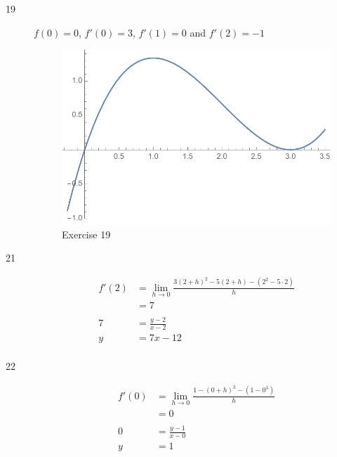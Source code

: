 \documentclass[letterpaper, landscape]{exam}
\begin{document}
\begin{description}
\begin{enumerate}[(a)]
        \end{enumerate}

      \item[19] $f(0) = 0$, $f'(0) = 3$, $f'(1) = 0$ and $f'(2) = -1$
        
        \begin{figure}[H]
          \centering
          \includegraphics[scale = 0.5]{ex19.pdf}
          \caption{Exercise 19}
          \label{fig:ex19}
        \end{figure}

      \item[21] 
        \begin{align*}
          f'(2) & = \lim_{h \to 0} \frac{3 (2 + h)^2 - 5(2 + h) - \left( 2^2 - 5 \cdot 2 \right)}{h} \\
                & = 7 \\
          \\
          7     & = \frac{y - 2}{x - 2} \\
          y     & = 7x - 12 \\
        \end{align*}
 
      \item[22] 
        \begin{align*}
          f'(0) & = \lim_{h \to 0} \frac{1 - (0 + h)^3 - \left( 1 - 0^3 \right)}{h} \\
                & = 0 \\
          \\
          0     & = \frac{y - 1}{x - 0} \\
          y     & = 1 \\
        \end{align*}
 

\end{description}
\end{document}

